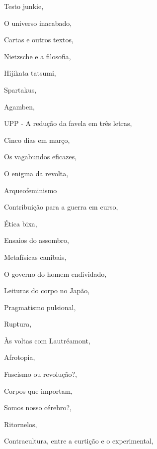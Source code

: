 \begin{multicols}{2}
\begin{enumerate}
{\item Testo junkie, {}
\item O universo inacabado, {}
\item Cartas e outros textos, {}
\item Nietzsche e a filosofia, {}
\item Hijikata tatsumi, {}
\item Spartakus, {}
\item Agamben, {}
\item UPP - A redução da favela em três letras, {}
\item Cinco dias em março, {}
\item Os vagabundos eficazes, {}
\item O enigma da revolta, {}
\item Arqueofeminismo
\item Contribuição para a guerra em curso, {}
\item Ética bixa, {}
\item Ensaios do assombro, {}
\item Metafísicas canibais, {}
\item O governo do homem endividado, {}
\item Leituras do corpo no Japão, {}
\item Pragmatismo pulsional, {}
\item Ruptura, {}
\item Às voltas com Lautréamont, {}
\item Afrotopia, {}
\item Fascismo ou revolução?, {}
\item Corpos que importam, {}
\item Somos nosso cérebro?, {}
\item Ritornelos, {}
\item Contracultura, entre a curtição e o experimental, {}
}
\end{enumerate}
\end{multicols}

\pagebreak